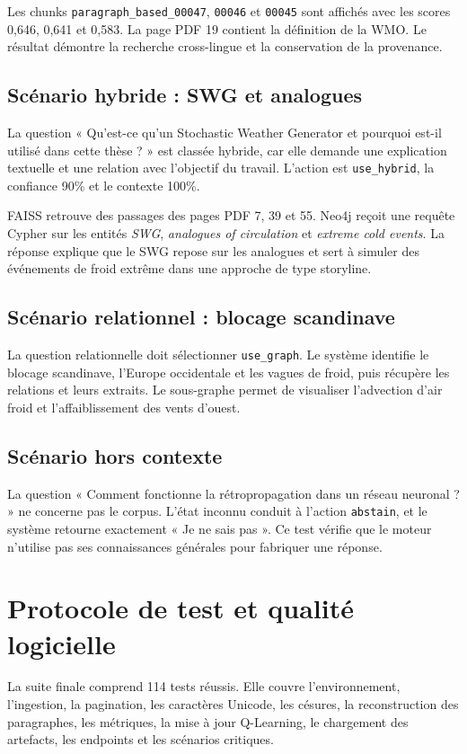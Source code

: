 \documentclass[12pt,a4paper,oneside]{report}
\newcommand{\tech}[1]{\texttt{#1}}
\begin{document}
Les chunks \tech{paragraph\_based\_00047}, \tech{00046} et \tech{00045} sont affichés avec les scores 0,646, 0,641 et 0,583. La page PDF 19 contient la définition de la WMO. Le résultat démontre la recherche cross-lingue et la conservation de la provenance.

\subsection{Scénario hybride : SWG et analogues}
La question « Qu'est-ce qu'un Stochastic Weather Generator et pourquoi est-il utilisé dans cette thèse ? » est classée hybride, car elle demande une explication textuelle et une relation avec l'objectif du travail. L'action est \tech{use\_hybrid}, la confiance 90\% et le contexte 100\%.

FAISS retrouve des passages des pages PDF 7, 39 et 55. Neo4j reçoit une requête Cypher sur les entités \textit{SWG}, \textit{analogues of circulation} et \textit{extreme cold events}. La réponse explique que le SWG repose sur les analogues et sert à simuler des événements de froid extrême dans une approche de type storyline.

\subsection{Scénario relationnel : blocage scandinave}
La question relationnelle doit sélectionner \tech{use\_graph}. Le système identifie le blocage scandinave, l'Europe occidentale et les vagues de froid, puis récupère les relations et leurs extraits. Le sous-graphe permet de visualiser l'advection d'air froid et l'affaiblissement des vents d'ouest.

\subsection{Scénario hors contexte}
La question « Comment fonctionne la rétropropagation dans un réseau neuronal ? » ne concerne pas le corpus. L'état inconnu conduit à l'action \tech{abstain}, et le système retourne exactement « Je ne sais pas ». Ce test vérifie que le moteur n'utilise pas ses connaissances générales pour fabriquer une réponse.

\section{Protocole de test et qualité logicielle}
La suite finale comprend 114 tests réussis. Elle couvre l'environnement, l'ingestion, la pagination, les caractères Unicode, les césures, la reconstruction des paragraphes, les métriques, la mise à jour Q-Learning, le chargement des artefacts, les endpoints et les scénarios critiques.
\end{document}

